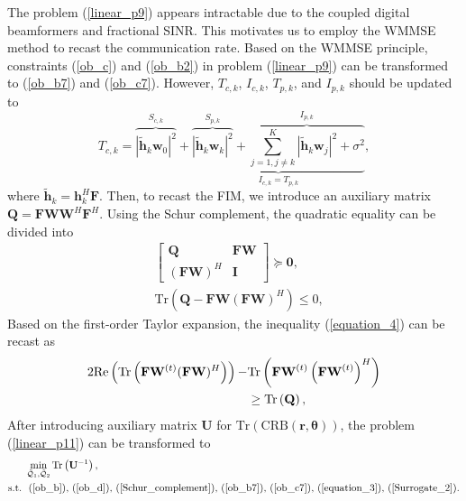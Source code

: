 \documentclass[10pt,journal,twocolumn]{IEEEtran}
\begin{document}
The problem (\ref{linear_p9}) appears intractable due to the coupled digital beamformers and fractional SINR.  This motivates us to employ the WMMSE method to recast the communication rate. Based on the WMMSE principle, constraints (\ref{ob_c}) and (\ref{ob_b2}) in problem (\ref{linear_p9}) can be transformed to (\ref{ob_b7}) and (\ref{ob_c7}). However, $T_{c,k}$, $I_{c,k}$, $T_{p,k}$, and $I_{p,k}$ should be updated to 
\begin{equation}
T_{c,k}=\overbrace{{\left|\tilde{\mathbf{h}}_{k}\mathbf{w}_0\right|}^2}^{S_{c,k}}+\underbrace{\overbrace{{\left|\tilde{\mathbf{h}}_{k}\mathbf{w}_{k}\right|}^2}^{S_{{p,k}}}+\overbrace{\sum_{j=1,j\neq k}^{K}\left|\tilde{\mathbf{h}}_{k}\mathbf{w}_j\right|^2+\sigma^2}^{I_{{p,k}}}}_{I_{c,k}=T_{p,k}},
\label{equ:rece_power3}
\end{equation}
where $\tilde{\mathbf{h}}_{k} =\mathbf{h}^H_k\mathbf{F}$. Then, to recast the FIM, we introduce an auxiliary matrix $\mathbf{Q}=\mathbf{F}\mathbf{W}\mathbf{W}^H\mathbf{F}^H$. Using the Schur complement, the quadratic equality can be divided into 
\begin{subequations}\label{equation_constraint_2}
\begin{align}
&\begin{bmatrix} \mathbf{Q} & \mathbf{FW} \\ (\mathbf{FW})^H & \mathbf{I} \end{bmatrix}\succeq\mathbf{0},\label{equation_3}\\
 &\text{Tr}\left(\mathbf{Q}-\mathbf{FW}(\mathbf{FW})^H\right)\leq 0,\label{equation_4}
\end{align}
\end{subequations}
Based on the first-order Taylor expansion, the inequality (\ref{equation_4}) can be recast as
\begin{align}
2\text{Re}\left(\text{Tr}\left(\mathbf{F}\mathbf{W}^{(t)}(\mathbf{FW})^H\right)\right)-&\text{Tr}\left(\mathbf{FW}^{(t)}\left(\mathbf{FW}^{(t)}\right)^H\right)\notag\\&\geq \text{Tr}\left(\mathbf{Q}\right),
\label{Surrogate_2}
\end{align}
After introducing auxiliary matrix $\mathbf{U}$ for $\text{Tr}\left(\text{CRB}\left(\mathbf{r},\bm{\theta}\right)\right)$,  the problem (\ref{linear_p11}) can be transformed to
\begin{subequations}\label{linear_p12}
	\begin{align}
&\min_{\tilde{\mathcal{Q}}_1,\tilde{\mathcal{Q}}_2} \text{Tr}\left(\mathbf{U}^{-1}\right),\label{ob_a12}\\
	\text{s.t.}~
  &\mbox{ (\ref{ob_b}),~(\ref{ob_d}),~(\ref{Schur_complement}),~(\ref{ob_b7}),~(\ref{ob_c7}),~(\ref{equation_3}),~(\ref{Surrogate_2})}.\label{ob_b12}
	\end{align}
\end{subequations}
\end{document}
